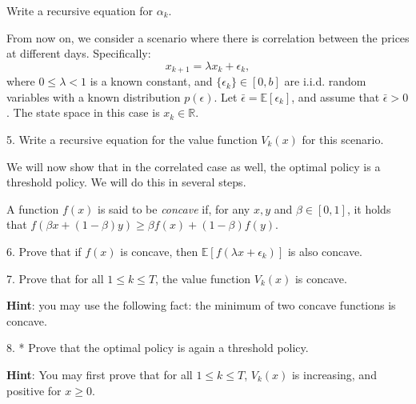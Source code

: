 \quad Write a recursive equation for $\alpha_k$.

\vspace{20pt}
From now on, we consider a scenario where there is correlation between the prices at different days. Specifically:
\begin{equation*}
    x_{k+1} = \lambda x_k + \epsilon_k,
\end{equation*}
where $0 \leq \lambda < 1$ is a known constant, and $\{\epsilon_k\} \in [0,b]$ are i.i.d. random variables with a known distribution $p(\epsilon)$. Let $\bar{\epsilon} = \mathbb{E} [\epsilon_k ]$, and assume that $\bar{\epsilon} > 0$. The state space in this case is $x_k\in \mathbb{R}$.

5. Write a recursive equation for the value function $V_k(x)$ for this scenario.

\vspace{10pt}

We will now show that in the correlated case as well, the optimal policy is a threshold policy. We will do this in several steps.

A function $f(x)$ is said to be \emph{concave} if, for any $x,y$ and $\beta \in [0,1]$, it holds that $f(\beta x + (1-\beta) y) \geq  \beta f(x) + (1-\beta) f(y)$.

6. Prove that if $f(x)$ is concave, then $\mathbb{E} [f(\lambda x + \epsilon_k)]$ is also concave.

7. Prove that for all $1 \leq k \leq T$, the value function $V_k(x)$ is concave.

\quad \textbf{Hint}: you may use the following fact: the minimum of two concave functions is concave.


8. * Prove that the optimal policy is again a threshold policy.

\quad \textbf{Hint}: You may first prove that for all $1 \leq k \leq T$, $V_k(x)$ is increasing, and positive for $x\geq 0$. 